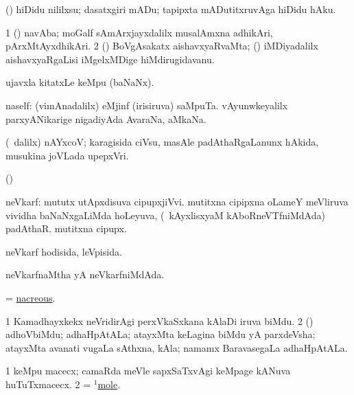 \bentry
{}
\gl{\sakirx}
\bmng
 (\ashi) hiDidu nililxsu; dasatxgiri mADu; tapipxta mADutitxruvAga hiDidu hAku. 
\emng
\eentry

\bentry
{}
\gl{\nA}
\bmng
\bnum
\num{1} (\ca) navAba; moGalf sAmArxjayxdalilx musalAmxna adhikAri, pArxMtAyxdhikAri. 
\num{2} (\pArxparx) BoVgAsakatx aishavxyaRvaMta; (\kanmu) iMDiyadalilx aishavxyaRgaLisi iMgelxMDige hiMdirugidavanu. 
\enum
\emng
\eentry

\bentry
{}
\gl{\nA}
\bmng
ujavxla kitatxLe keMpu (baNaNx). 
\emng
\eentry

\bentry
{}
\gl{\nA}
\bmng
naself: 
\banum
{}(vimAnadalilx) eMjinf (irisiruva) saMpuTa. 
vAyunwkeyalilx parxyANikarige nigadiyAda AvaraNa, aMkaNa. 
\eanum
\emng
\eentry

\bentry
{}
\gl{\nA}
\bmng
 (\sA\ \bava dalilx) nAYxcoV; karagisida ciVsu, masAle padAthaRgaLanunx hAkida, musukina joVLada upepxVri. 
\emng
\eentry

\bentry
{}
\gl{\saMkiSx}
\bmng
(\birx)  
\emng
\eentry

\bentry
{}
\gl{\nA}
\bmng
neVkarf: 
\banum
{} mututx utApxdisuva cipupxjiVvi. 
 mutitxna cipipxna oLameY meVliruva vividha baNaNxgaLiMda hoLeyuva, (\kanmu\ kAyxlisxyaM kAboRneVTfniMdAda) padAthaR. 
 mutitxna cipupx. 
\eanum
\emng
\eentry

\bentry
{}
\gl{\gu}
\bmng
neVkarf hodisida, leVpisida. 
\emng
\eentry

\bentry
{}
\gl{\gu}
\bmng
neVkarfnaMtha yA neVkarfniMdAda. 
\emng
\eentry

\bentry
{}
\gl{\gu}
\bmng
= \hyperlink{nacreous}{nacreous}.
\emng
\eentry

\bentry
{}
\gl{\nA}
\bmng
\bnum
\num{1} Kamadhayxkekx neVridirAgi perxVkaSxkana kAlaDi iruva biMdu. 
\num{2} (\rUpa) adhoVbiMdu; adhaHpAtALa; atayxMta keLagina biMdu yA parxdeVsha; atayxMta avanati \mo vugaLa sAthxna, kAla;  namamx BaravasegaLa adhaHpAtALa. 
\enum
\emng
\eentry

\bentry
{}
\gl{\nA}
\bmng
\bnum
\num{1} keMpu macecx; camaRda meVle sapxSaTxvAgi keMpage kANuva huTuTxmacecx. 
\num{2} = \hyperref{kandict_m.pdf}{M}{mole(1)}{$^1$mole}. 
\enum
\emng
\eentry


